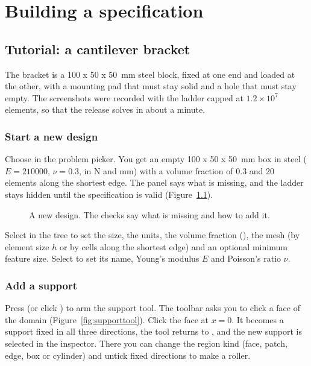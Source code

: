 \chapter{Building a specification}\label{ch:spec}

\section{Tutorial: a cantilever bracket}\label{sec:tutorial}
The bracket is a 100 x 50 x 50~mm steel block, fixed at one end and loaded at the other, with a mounting pad that must
stay solid and a hole that must stay empty. The screenshots were recorded with the ladder capped at
$1.2\times10^{7}$ elements, so that the release solves in about a minute.

\subsection{Start a new design}
Choose  in the problem picker. You get an empty 100 x 50 x 50~mm box in steel ($E = 210000$,
$\nu = 0.3$, in N and mm) with a volume fraction of 0.3 and 20 elements along the shortest edge. The  panel
says what is missing, and the ladder stays hidden until the specification is valid (Figure~\ref{fig:newdesign}).

\begin{figure}[t]
\caption{A new design. The checks say what is missing and how to add it.}
\label{fig:newdesign}
\end{figure}

Select  in the tree to set the size, the units, the volume fraction (), the mesh (by element
size $h$ or by cells along the shortest edge) and an optional minimum feature size. Select  to set its
name, Young's modulus $E$ and Poisson's ratio $\nu$.

\subsection{Add a support}
Press  (or click ) to arm the support tool. The toolbar asks you to click a face of the domain
(Figure~\ref{fig:supporttool}). Click the face at $x = 0$. It becomes a support fixed in all three directions, the tool
returns to , and the new support is selected in the inspector. There you can change the region kind (face,
patch, edge, box or cylinder) and untick fixed directions to make a roller.

